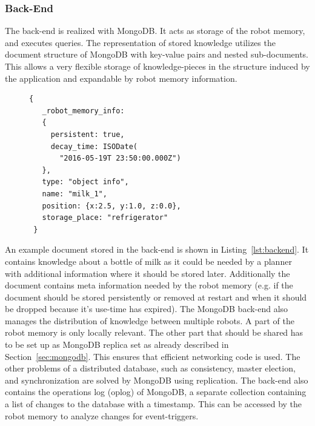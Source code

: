 \documentclass[a4paper,11pt]{article}
\newcommand{\refsec}[1]{Section~\ref{#1}}
\newcommand{\reflst}[1]{Listing~\ref{#1}}
\begin{document}
\subsubsection{Back-End}
\label{sec:back-end}
The back-end is realized with MongoDB. It acts as storage of the robot
memory, and executes queries. The representation of stored knowledge
utilizes the document structure of MongoDB with key-value pairs and
nested sub-documents. This allows a very flexible storage of
knowledge-pieces in the structure induced by the application and
expandable by robot memory information.

\begin{figure}
  \vspace{-0.8cm}
\begin{lstlisting}[style=SmallJSON,
  caption={Representation of a knowledge piece in the back-end},
  label=lst:backend,
  framexleftmargin=1pt, xleftmargin=0pt,
 morekeywords={}, numbers=none]
 {
   _robot_memory_info:
   {
     persistent: true,
     decay_time: ISODate(
       "2016-05-19T 23:50:00.000Z")
   },
   type: "object info",
   name: "milk_1",
   position: {x:2.5, y:1.0, z:0.0},
   storage_place: "refrigerator"
 }
\end{lstlisting}
\vspace{-14mm}
\end{figure}
An example document stored in the back-end is shown in
\reflst{lst:backend}.  It contains knowledge about a bottle of milk as
it could be needed by a planner with additional information where it
should be stored later. Additionally the document contains meta
information needed by the robot memory (e.g. if the document should be
stored persistently or removed at restart and when it should be
dropped because it's use-time has expired). The MongoDB back-end also
manages the distribution of knowledge between multiple robots. A part
of the robot memory is only locally relevant. The other part that
should be shared has to be set up as MongoDB replica set as already
described in \refsec{sec:mongodb}. This ensures that efficient
networking code is used. The other problems of a distributed database,
such as consistency, master election, and synchronization are solved
by MongoDB using replication. The back-end also contains the
operations log (oplog) of MongoDB, a separate
collection containing a list of changes to the database with a
timestamp. This can be accessed by the robot memory to analyze
changes for event-triggers.
\end{document}
